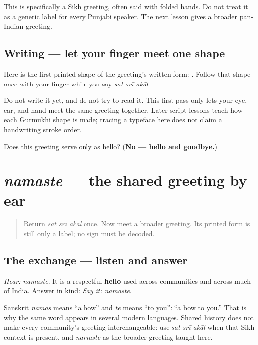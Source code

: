 \begin{culture}
This is specifically a Sikh greeting, often said with folded hands. Do not treat it as a generic label for every Punjabi speaker. The next lesson gives a broader pan-Indian greeting.
\end{culture}

\subsection*{Writing — let your finger meet one shape}
Here is the first printed shape of the greeting's written form: \textbf{}. Follow that shape once with your finger while you say \emph{sat srī akāl}.

Do not write it yet, and do not try to read it. This first pass only lets your eye, ear, and hand meet the same greeting together. Later script lessons teach how each Gurmukhi shape is made; tracing a typeface here does not claim a handwriting stroke order.

\begin{tcolorbox}[breakable,colback=teal!4,colframe=teal!35!black,title={Before you move on}]
Does this greeting serve only as hello? (\textbf{No — hello and goodbye.})
\end{tcolorbox}
\section[\texorpdfstring{\pa{ਨਮਸਤੇ} (namaste)}{ਨਮਸਤੇ (namaste)}]{\emph{namaste} — the shared greeting by ear}

\label{lesson:PA-C01-namaste}



\begin{quote}
Return \emph{sat srī akāl} once. Now meet a broader greeting. Its printed form is still only a label; no sign must be decoded.
\end{quote}

\subsection*{The exchange — listen and answer}
\emph{Hear:} \emph{namaste}. It is a respectful \textbf{hello} used across communities and across much of India. Answer in kind: \emph{Say it:} \emph{namaste}.

Sanskrit \emph{namas} means “a bow” and \emph{te} means “to you”: “a bow to you.” That is why the same word appears in several modern languages. Shared history does not make every community’s greeting interchangeable: use \emph{sat srī akāl} when that Sikh context is present, and \emph{namaste} as the broader greeting taught here.

